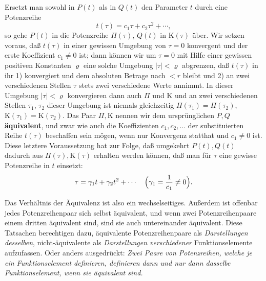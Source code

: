 \documentclass{article}
\begin{document}
Ersetzt man sowohl in $P(t)$ als in $Q(t)$ den Parameter $t$ durch eine Potenzreihe
\[ t(\tau) = c_1 \tau + c_2 \tau^2 + \cdots, \]
so gehe $P(t)$ in die Potenzreihe $\Pi(\tau)$, $Q(t)$ in $\mathrm{K}(\tau)$ über. Wir setzen voraus, daß $t(\tau)$ in einer gewissen Umgebung von $\tau = 0$ konvergent und der erste Koeffizient $c_1 \neq 0$ ist; dann können wir um $\tau = 0$ mit Hilfe einer gewissen positiven Konstanten $\varrho$ eine solche Umgebung $|\tau| < \varrho$ abgrenzen, daß $t(\tau)$ in ihr 1) konvergiert und dem absoluten Betrage nach $< r$ bleibt und 2) an zwei verschiedenen Stellen $\tau$ stets zwei verschiedene Werte annimmt. In dieser Umgebung $|\tau| < \varrho$ konvergieren dann auch $\Pi$ und $\mathrm{K}$ und an zwei verschiedenen Stellen $\tau_1$, $\tau_2$ dieser Umgebung ist niemals gleichzeitig $\Pi(\tau_1) = \Pi(\tau_2)$, $\mathrm{K}(\tau_1) = \mathrm{K}(\tau_2)$. Das Paar $\Pi, \mathrm{K}$ nennen wir dem ursprünglichen $P, Q$ \textbf{äquivalent}, und zwar wie auch die Koeffizienten $c_1, c_2, \dots$ der substituierten Reihe $t(\tau)$ beschaffen sein mögen, wenn nur Konvergenz statthat und $c_1 \neq 0$ ist. Diese letztere Voraussetzung hat zur Folge, daß umgekehrt $P(t), Q(t)$ dadurch aus $\Pi(\tau), \mathrm{K}(\tau)$ erhalten werden können, daß man für $\tau$ eine gewisse Potenzreihe in $t$ einsetzt:
\[ \tau = \gamma_1 t + \gamma_2 t^2 + \cdots \quad \Bigl(\gamma_1 = \frac{1}{c_1} \neq 0\Bigr). \]

Das Verhältnis der Äquivalenz ist also ein wechselseitiges. Außerdem ist offenbar jedes Potenzreihenpaar sich selbst äquivalent, und wenn zwei Potenzreihenpaare einem dritten äquivalent sind, sind sie auch untereinander äquivalent. Diese Tatsachen berechtigen dazu, äquivalente Potenzreihenpaare als \emph{Darstellungen desselben}, nicht-äquivalente als \emph{Darstellungen verschiedener} Funktionselemente aufzufassen. Oder anders ausgedrückt: \emph{Zwei Paare von Potenzreihen, welche je ein Funktionselement definieren, definieren dann und nur dann dasselbe Funktionselement, wenn sie äquivalent sind.}
\end{document}
